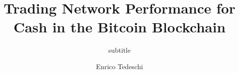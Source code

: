 \documentclass[USenglish]{uit-thesis}
\renewcommand{\bibname}{References}
\begin{document}
\renewcommand{\bibname}{References}

\title{Trading Network Performance for Cash in the Bitcoin Blockchain}
\subtitle{subtitle}			%
\author{Enrico Tedeschi}

\maketitle

\frontmatter


\end{document}

